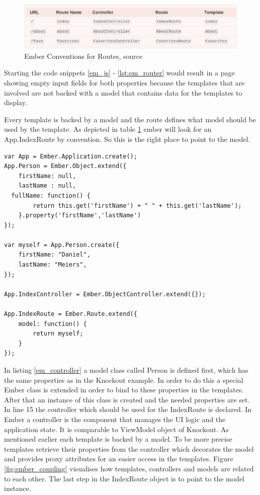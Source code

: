 \begin{figure}
	\centering	\includegraphics[width=1.0\textwidth]{./img/tech-ana/ember_routes_conventions.png}
	\caption{Ember Conventions for Routes, source \autocite{tech-ana:em-routes-coc}}
	\label{fig:ember_routes}
\end{figure}

Starting the code snippets \ref{em_js} - \ref{lst:em_router} would result in a page showing empty input fields for both properties because the templates that are involved are not backed with a model that contains data for the templates to display.

Every template is backed by a model and the route defines what model should be used by the template.
As depicted in table \ref{fig:ember_routes} ember will look for an App.IndexRoute by convention. So this is the right place to point to the model.

\begin{lstlisting}[label=em_controller,caption=app.js]
var App = Ember.Application.create();
App.Person = Ember.Object.extend({
	firstName: null,
	lastName : null,
  fullName: function() {
        return this.get('firstName') + " " + this.get('lastName');
    }.property('firstName','lastName')
});

var myself = App.Person.create({
    firstName: "Daniel",
    lastName: "Meiers",
});

App.IndexController = Ember.ObjectController.extend({});

App.IndexRoute = Ember.Route.extend({
    model: function() {
        return myself;
    }
});
\end{lstlisting}

In listing \ref{em_controller} a model class called Person is defined first, which has the same properties as in the Knockout example.
In order to do this a special Ember class is extended in order to bind to these properties in the templates.
After that an instance of this class is created and the needed properties are set.
In line 15 the controller which should be used for the IndexRoute is declared.
In Ember a controller is the component that manages the UI logic and the application state.
It is comparable to ViewModel object of Knockout.
As mentioned earlier each template is backed by a model.
To be more precise templates retrieve their properties from the controller which decorates the model and provides proxy attributes for an easier access in the templates. Figure \ref{fig:ember_coupling} visualises how templates, controllers and models are related to each other.
The last step in the IndexRoute object is to point to the model instance.

